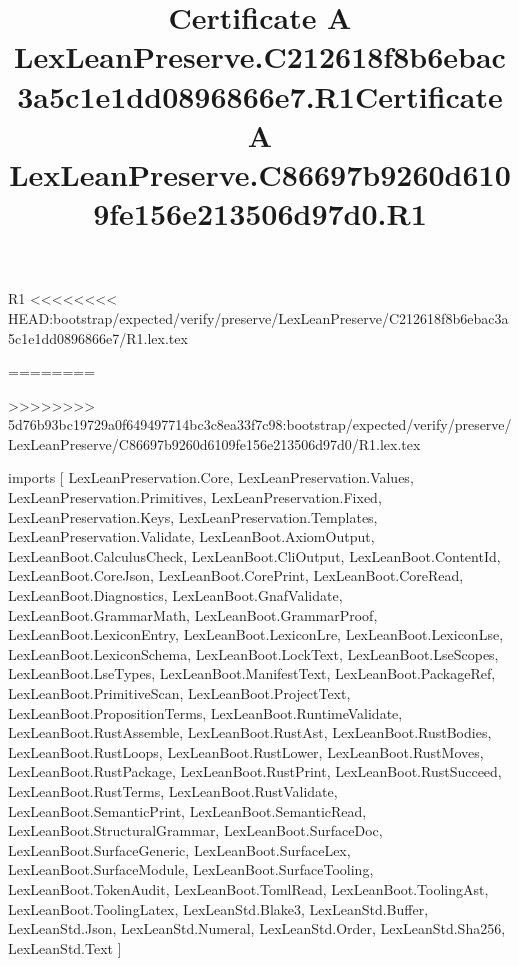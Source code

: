 \begin{lexlean}{R1}
<<<<<<<< HEAD:bootstrap/expected/verify/preserve/LexLeanPreserve/C212618f8b6ebac3a5c1e1dd0896866e7/R1.lex.tex
\title{Certificate A LexLeanPreserve.C212618f8b6ebac3a5c1e1dd0896866e7.R1}
========
\title{Certificate A LexLeanPreserve.C86697b9260d6109fe156e213506d97d0.R1}
>>>>>>>> 5d76b93bc19729a0f649497714bc3c8ea33f7c98:bootstrap/expected/verify/preserve/LexLeanPreserve/C86697b9260d6109fe156e213506d97d0/R1.lex.tex
\begin{coremodule}
imports [
  LexLeanPreservation.Core,
  LexLeanPreservation.Values,
  LexLeanPreservation.Primitives,
  LexLeanPreservation.Fixed,
  LexLeanPreservation.Keys,
  LexLeanPreservation.Templates,
  LexLeanPreservation.Validate,
  LexLeanBoot.AxiomOutput,
  LexLeanBoot.CalculusCheck,
  LexLeanBoot.CliOutput,
  LexLeanBoot.ContentId,
  LexLeanBoot.CoreJson,
  LexLeanBoot.CorePrint,
  LexLeanBoot.CoreRead,
  LexLeanBoot.Diagnostics,
  LexLeanBoot.GnafValidate,
  LexLeanBoot.GrammarMath,
  LexLeanBoot.GrammarProof,
  LexLeanBoot.LexiconEntry,
  LexLeanBoot.LexiconLre,
  LexLeanBoot.LexiconLse,
  LexLeanBoot.LexiconSchema,
  LexLeanBoot.LockText,
  LexLeanBoot.LseScopes,
  LexLeanBoot.LseTypes,
  LexLeanBoot.ManifestText,
  LexLeanBoot.PackageRef,
  LexLeanBoot.PrimitiveScan,
  LexLeanBoot.ProjectText,
  LexLeanBoot.PropositionTerms,
  LexLeanBoot.RuntimeValidate,
  LexLeanBoot.RustAssemble,
  LexLeanBoot.RustAst,
  LexLeanBoot.RustBodies,
  LexLeanBoot.RustLoops,
  LexLeanBoot.RustLower,
  LexLeanBoot.RustMoves,
  LexLeanBoot.RustPackage,
  LexLeanBoot.RustPrint,
  LexLeanBoot.RustSucceed,
  LexLeanBoot.RustTerms,
  LexLeanBoot.RustValidate,
  LexLeanBoot.SemanticPrint,
  LexLeanBoot.SemanticRead,
  LexLeanBoot.StructuralGrammar,
  LexLeanBoot.SurfaceDoc,
  LexLeanBoot.SurfaceGeneric,
  LexLeanBoot.SurfaceLex,
  LexLeanBoot.SurfaceModule,
  LexLeanBoot.SurfaceTooling,
  LexLeanBoot.TokenAudit,
  LexLeanBoot.TomlRead,
  LexLeanBoot.ToolingAst,
  LexLeanBoot.ToolingLatex,
  LexLeanStd.Blake3,
  LexLeanStd.Buffer,
  LexLeanStd.Json,
  LexLeanStd.Numeral,
  LexLeanStd.Order,
  LexLeanStd.Sha256,
  LexLeanStd.Text
]


\end{coremodule}
\end{lexlean}
